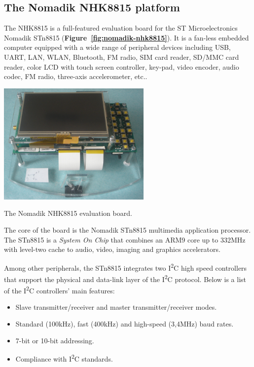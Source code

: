 \documentclass[a4paper,10pt]{article}
\makeatletter
\newenvironment{figurehere}{\def\@captype{figure}\vspace{2ex}}{\vspace{2ex}}
\newenvironment{packeditems}{
\begin{itemize}
  \setlength{\itemsep}{3pt}
  \setlength{\parskip}{0pt}
  \setlength{\parsep}{0pt}
}{\end{itemize}}
\newcommand{\iic}{I\textsuperscript{2}C }
\newcommand{\reff}[1]{\textbf{Figure~\ref{#1}}}
\makeatother
\begin{document}
\begin{multicols}{2}
\subsection{The Nomadik NHK8815 platform}
\label{sec:nomadik_nhk8815_platform}
The NHK8815 is a full-featured evaluation board for the ST Microelectronics
Nomadik STn8815 (\reff{fig:nomadik-nhk8815}). It is a fan-less embedded
computer equipped with a wide range of peripheral devices including USB, UART,
LAN, WLAN, Bluetooth, FM radio, SIM card reader, SD/MMC card reader, color LCD
with touch screen controller, key-pad, video encoder, audio codec, FM radio,
three-axis accelerometer, etc..

\begin{figurehere}
 \centering
 \includegraphics[width=7.5cm]{./figures/nomadik-nhk8815.jpg}
 \caption{The Nomadik NHK8815 evaluation board.}
 \label{fig:nomadik-nhk8815}
\end{figurehere}

The core of the board is the Nomadik STn8815 multimedia application processor.
The STn8815 is a \emph{System On Chip} that combines an ARM9 core up to 332MHz
with level-two cache to audio, video, imaging and graphics accelerators.

Among other peripherals, the STn8815 integrates two \iic high speed controllers
that support the physical and data-link layer of the \iic protocol.
Below is a list of the \iic controllers' main features:
\begin{packeditems}
	\item Slave transmitter/receiver and master transmitter/receiver modes.
	\item Standard (100kHz), fast (400kHz) and high-speed (3,4MHz) baud rates.
	\item 7-bit or 10-bit addressing.
	\item Compliance with \iic standards.
\end{packeditems}


\end{multicols}
\end{document}
